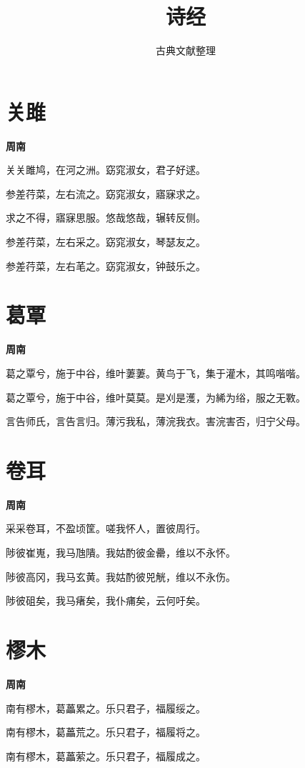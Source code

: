 \documentclass[12pt,a4paper]{ctexbook}
\title{诗经}
\author{古典文献整理}
\date{}
\begin{document}
\maketitle
\tableofcontents
\newpage
\section{关雎}
\textbf{周南}\par\vspace{0.5em}
关关雎鸠，在河之洲。窈窕淑女，君子好逑。\par
参差荇菜，左右流之。窈窕淑女，寤寐求之。\par
求之不得，寤寐思服。悠哉悠哉，辗转反侧。\par
参差荇菜，左右采之。窈窕淑女，琴瑟友之。\par
参差荇菜，左右芼之。窈窕淑女，钟鼓乐之。\par

\section{葛覃}
\textbf{周南}\par\vspace{0.5em}
葛之覃兮，施于中谷，维叶萋萋。黄鸟于飞，集于灌木，其鸣喈喈。\par
葛之覃兮，施于中谷，维叶莫莫。是刈是濩，为絺为绤，服之无斁。\par
言告师氏，言告言归。薄污我私，薄浣我衣。害浣害否，归宁父母。\par

\section{卷耳}
\textbf{周南}\par\vspace{0.5em}
采采卷耳，不盈顷筐。嗟我怀人，置彼周行。\par
陟彼崔嵬，我马虺隤。我姑酌彼金罍，维以不永怀。\par
陟彼高冈，我马玄黄。我姑酌彼兕觥，维以不永伤。\par
陟彼砠矣，我马瘏矣，我仆痡矣，云何吁矣。\par

\section{樛木}
\textbf{周南}\par\vspace{0.5em}
南有樛木，葛藟累之。乐只君子，福履绥之。\par
南有樛木，葛藟荒之。乐只君子，福履将之。\par
南有樛木，葛藟萦之。乐只君子，福履成之。\par
\end{document}
